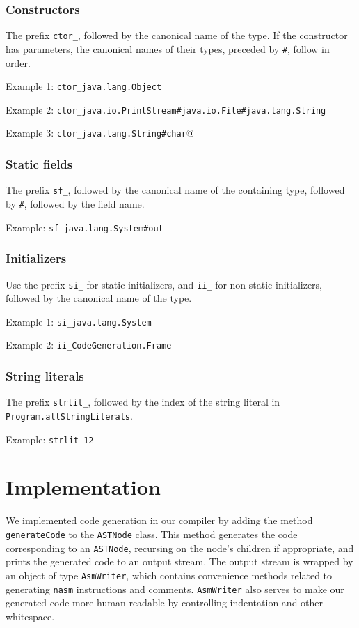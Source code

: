 \documentclass[12pt]{article}
\newcommand{\code}[1]{\texttt{#1}}
\begin{document}
\subsubsection{Constructors}

The prefix \code{ctor\_}, followed by the canonical name of the type. If the constructor has parameters, the canonical names of their types, preceded by \code{\#}, follow in order.

Example 1: \code{ctor\_java.lang.Object} 

Example 2: \code{ctor\_java.io.PrintStream\#java.io.File\#java.lang.String}

Example 3: \code{ctor\_java.lang.String\#char$@$}

\subsubsection{Static fields}
The prefix \code{sf\_}, followed by the canonical name of the containing type, followed by \code{\#}, followed by the field name.

Example: \code{sf\_java.lang.System\#out}

\subsubsection{Initializers}

Use the prefix \code{si\_} for static initializers, and \code{ii\_} for non-static initializers, followed by the canonical name of the type.

Example 1: \code{si\_java.lang.System} 

Example 2: \code{ii\_CodeGeneration.Frame}

\subsubsection{String literals}

The prefix \code{strlit\_}, followed by the index of the string literal in \code{Program.allStringLiterals}.

Example: \code{strlit\_12}

\section{Implementation}

We implemented code generation in our compiler by adding the method \code{generateCode} to the \code{ASTNode} class.  This method generates the code corresponding to an \code{ASTNode}, recursing on the node's children if appropriate, and prints the generated code to an output stream.  The output stream is wrapped by an object of type \code{AsmWriter}, which contains convenience methods related to generating \code{nasm} instructions and comments. \code{AsmWriter} also serves to make our generated code more human-readable by controlling indentation and other whitespace.
\end{document}

